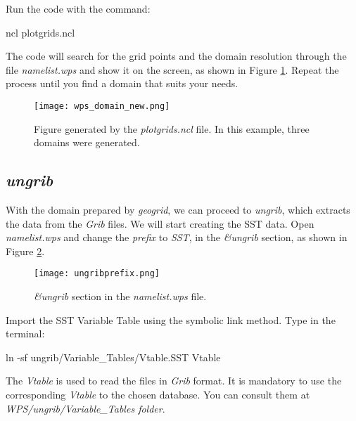  Run the code with the command:
\bigskip

\begin{bashcode}
ncl plotgrids.ncl
\end{bashcode}
\bigskip

 The code will search for the grid points and the domain resolution through the file \textit{namelist.wps} and show it on the screen, 
as shown in Figure \textcolor{bleu_cite}{\ref{nclgrids}}. Repeat the process until you find a domain that suits your needs.
\bigskip

\begin{figure}[H]
    \centering
    \texttt{[image: wps\_domain\_new.png]}
    \caption{Figure generated by the \textit{plotgrids.ncl} file. In this example, three domains were generated.}
    \label{nclgrids}
\end{figure}
\bigskip

\subsection{\textit{ungrib}}\label{ungribsecao}
\bigskip
 With the domain prepared by \textit{geogrid}, we can proceed to \textit{ungrib}, which extracts the data from the
 \textit {Grib} files. We will start creating the SST data. Open \textit{namelist.wps}
and  change the \textit{prefix} to \textit{SST}, in the \textit{\&ungrib} section, as shown in Figure \textcolor{bleu_cite}{\ref{ungribprefix}}.
\bigskip

\begin{figure}[H]
    \centering
    \texttt{[image: ungribprefix.png]}
    \caption{ \textit{\&ungrib} section in the \textit{namelist.wps} file.}
    \label{ungribprefix}
\end{figure}
\bigskip

 Import the SST Variable Table using the symbolic link method. Type in the terminal:
\bigskip

\begin{bashcode}
ln -sf ungrib/Variable_Tables/Vtable.SST Vtable
\end{bashcode}
\bigskip

\begin{tcolorbox}[enhanced,
  grow to left by=0cm,%
  grow to right by=0cm,%
  enlarge top by=0cm,%
  enlarge bottom by=0cm,%
  tcbox raise base,
  boxrule=1.0pt,
  left=18mm,
  colframe=red!50!black,coltext=red!25!black,colback=red!10!white,
  overlay={\begin{tcbclipinterior}\fill[red!75!blue!50!white] (frame.south west)
    rectangle node[text=white,font=\sffamily\bfseries\footnotesize,rotate=0] {WARNING} ([xshift=18mm]frame.north west);\end{tcbclipinterior}}]
The \textit{Vtable} is used to read the files in \textit{Grib} format. It is mandatory to use the corresponding \textit{Vtable} to the chosen 
database. You can consult them at \textit{WPS/ungrib/Variable\_Tables folder}.
\end{tcolorbox}
\bigskip

